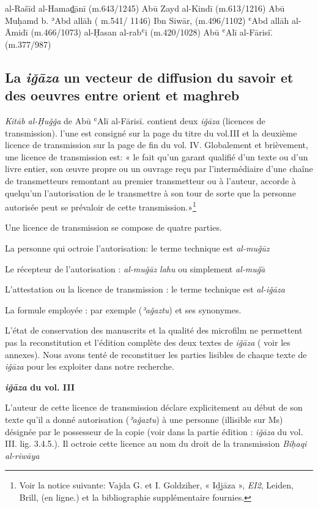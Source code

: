 \documentclass[a4paper,12pt]{report}
\begin{document}
al-Rašīd al-Hamaḏ̠ān\=i  (m.643/1245) 
 Abū Zayd al-Kindī  (m.613/1216) 
  Abū Muḥamd b. ʾAbd allāh ( m.541/ 1146) 
 Ibn Siwār, (m.496/1102)
ʿAbd allāh al-Āmidī (m.466/1073)
 al-Ḥasan al-rabʿi (m.420/1028)
Abū ʿAlī  al-Fārisi.̄  (m.377/987)











\subsection{ La \textit{iǧāza} un vecteur de diffusion du savoir et des oeuvres entre orient et maghreb  } 

 \textit{Kitāb al-Ḥuǧǧa} de Abū ʿAlī al-Fāris\=i. contient deux \textit{iǧāza} (licences de transmission). l'une est consigné sur la page du titre du vol.III et  la deuxième licence de transmission sur la  page de fin du vol. IV. Globalement et brièvement, une licence de transmission est: « le fait qu’un garant qualifié d’un texte ou d’un livre entier, son œuvre propre ou un ouvrage reçu par l’intermédiaire d’une chaîne de transmetteurs remontant au premier transmetteur ou à l’auteur, accorde à quelqu’un l’autorisation de le transmettre à son tour de sorte que la personne autorisée peut se prévaloir de cette transmission.»\footnote{ Voir la notice suivante: Vajda G. et I. Goldziher, « Id̲j̲āza », \textit{ EI2}, Leiden, Brill, (en ligne.)  et la bibliographie supplémentaire fournies. }

Une licence de transmission se compose de quatre parties.

 La personne qui octroie l'autorisation: le terme technique est  \textit{al-muǧ\=uz}  

 Le récepteur de l'autorisation : \textit{al-muǧāz lahu} ou simplement \textit{al-muǧa}̄

 L'attestation ou la licence de transmission : le terme technique est \textit{al-iǧāza}


  La formule employée : par exemple    (\textit{ʾaǧaztu}) et ses synonymes.
 
 L'état de conservation des manuscrits  et la qualité des microfilm ne permettent pas la reconstitution et l'édition complète  des deux textes de \textit{iǧāza}  ( voir les annexes).  Nous avons tenté de reconstituer les parties lisibles de chaque texte de \textit{iǧāza} pour les exploiter dans notre recherche. 
\begin{center}
    

\textbf{\textit{iǧāza} du vol. III}
\end{center}
L'auteur de cette licence de transmission déclare explicitement  au début de son texte qu'il a donné autorisation (\textit{ʾaǧaztu}) à une personne (illisible sur Ms) désignée par le possesseur de la copie (voir dans la partie édition : \textit{iǧāza} du vol. III. lig. 3.4.5.). Il octroie cette licence  au nom du droit de la transmission \textit{Biḥaqi al-riwāya}
\end{document}
